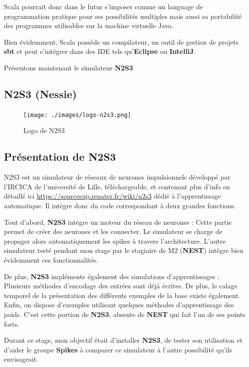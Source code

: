 Scala pourrait donc dans le futur s'imposer comme un language de
programmation pratique pour ses possibilités multiples mais aussi sa
portabilité des programmes utilisables sur la machine virtuelle Java.

Bien évidemment, Scala possède un compilateur, un outil de gestion de
projets \textbf{sbt} et peut s'intégrer dans des IDE tels
qu'\textbf{Eclipse} ou \textbf{IntelliJ}.

Présentons maintenant le simulateur \textbf{N2S3}

\hypertarget{n2s3-nessie}{%
\subsection{N2S3 (Nessie)}\label{n2s3-nessie}}

\begin{figure}[h!]
\label{fig:logo-n2s3}
\centering
\texttt{[image: ./images/logo-n2s3.png]}
\caption{Logo de N2S3}
\end{figure}

\hypertarget{pruxe9sentation-de-n2s3}{%
\subsection{Présentation de N2S3}\label{pruxe9sentation-de-n2s3}}

N2S3 est un simulateur de réseaux de neurones impulsionnels développé
par l'IRCICA de l'université de Lille, téléchargeable, et contenant plus
d'info en détaillé ici \url{https://sourcesup.renater.fr/wiki/n2s3}
dédié à l'apprentissage automatique. Il intègre donc du code
correspondant à deux grandes fonctions.

Tout d'abord, \textbf{N2S3} intègre un moteur du réseau de neurones :
Cette partie permet de créer des neurones et les connecter. Le
simulateur se charge de propager alors automatiquement les spikes à
travers l'architecture. L'autre simulateur testé pendant mon stage par
le stagiaire de M2 (\textbf{NEST}) intègre bien évidemment ces
fonctionnalités.

De plus, \textbf{N2S3} implémente également des simulations
d'apprentissages : Plusieurs méthodes d'encodage des entrées sont déjà
écrites. De plus, le calage temporel de la présentation des différents
exemples de la base existe également. Enfin, on dispose d'exemples
utilisant quelques méthodes d'apprentissage des poids. C'est cette
portion de \textbf{N2S3}, absente de \textbf{NEST} qui fait l'un de ses
points forts.

Durant ce stage, mon objectif était d'installer \textbf{N2S3}, de tester
son utilisation et d'aider le groupe \textbf{Spikes} à comparer ce
simulateur à l'autre possibilité qu'ils envisageait.

